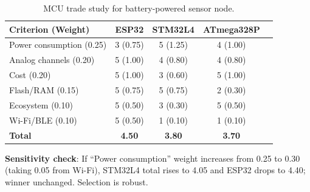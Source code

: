 \begin{table}[htbp]\centering\small
\begin{tabularx}{\textwidth}{l c c c c}
\toprule
\textbf{Criterion (Weight)} & \textbf{ESP32\index{ESP32}} & \textbf{STM32L4} & \textbf{ATmega328P} \\
\midrule
Power consumption (0.25) & 3 (0.75) & 5 (1.25) & 4 (1.00) \\
Analog channels (0.20) & 5 (1.00) & 4 (0.80) & 4 (0.80) \\
Cost (0.20) & 5 (1.00) & 3 (0.60) & 5 (1.00) \\
Flash/RAM (0.15) & 5 (0.75) & 5 (0.75) & 2 (0.30) \\
Ecosystem (0.10) & 5 (0.50) & 3 (0.30) & 5 (0.50) \\
Wi-Fi/BLE (0.10) & 5 (0.50) & 1 (0.10) & 1 (0.10) \\
\midrule
\textbf{Total} & \textbf{4.50} & \textbf{3.80} & \textbf{3.70} \\
\bottomrule
\end{tabularx}
\caption{MCU trade study for battery-powered sensor node.}
\end{table}

\textbf{Sensitivity check}: If ``Power consumption'' weight increases from 0.25 to 0.30 (taking 0.05 from Wi-Fi), STM32L4 total rises to 4.05 and ESP32 drops to 4.40; winner unchanged. Selection is robust.

